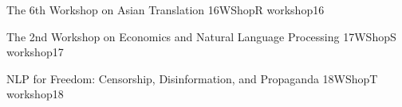 \begin{wsschedule}
 {The 6th Workshop on Asian Translation}
 {16}{WShopR}
 {workshop16}
 {\WShopLocR}
 
\end{wsschedule}

\begin{wsschedule}
 {The 2nd Workshop on Economics and Natural Language Processing}
 {17}{WShopS}
 {workshop17}
 {\WShopLocS}
 
\end{wsschedule}

\begin{wsschedule}
 {NLP for Freedom: Censorship, Disinformation, and Propaganda}
 {18}{WShopT}
 {workshop18}
 {\WShopLocT}
 
\end{wsschedule}
 
\clearpage{\thispagestyle{emptyheader}\cleardoublepage}
